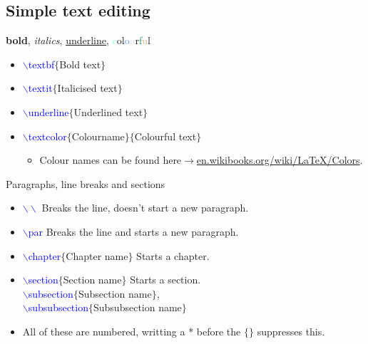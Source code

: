 \documentclass[usenames,dvipsnames,aspectratio=169]{beamer}
\newcommand{\aitem}{\item[$\cdot$]}
\begin{document}
\subsection{Simple text editing}
\begin{frame}[t]{\textbf{bold}, \textit{italics}, \underline{underline}, \textcolor{Aquamarine}{c}\textcolor{BrickRed}{o}\textcolor{CarnationPink}{l}\textcolor{CornflowerBlue}{o}\textcolor{Lavender}{u}\textcolor{Periwinkle}{r}\textcolor{SeaGreen}{f}\textcolor{Tan}{u}\textcolor{WildStrawberry}{l}}
\begin{itemize}
\item \textcolor{blue}{$\backslash$textbf}\textcolor{PineGreen}{$\{$Bold text$\}$}
\item \textcolor{blue}{$\backslash$textit}\textcolor{PineGreen}{$\{$Italicised text$\}$}
\item \textcolor{blue}{$\backslash$underline}\textcolor{PineGreen}{$\{$Underlined text$\}$}
\item \textcolor{blue}{$\backslash$textcolor}\textcolor{PineGreen}{$\{$Colourname$\}$}$\{$Colourful text$\}$
\begin{itemize}
\item Colour names can be found here$\rightarrow$\textcolor{blue}{\url{en.wikibooks.org/wiki/LaTeX/Colors}}.
\end{itemize}
\end{itemize}
\end{frame}


\begin{frame}[t]{Paragraphs, line breaks and sections}
\begin{itemize}
\aitem \textcolor{blue}{$\backslash\backslash$} Breaks the line, doesn't start a new paragraph.
\aitem \textcolor{blue}{$\backslash$par} Breaks the line and starts a new paragraph.
\aitem \textcolor{blue}{$\backslash$chapter}\textcolor{PineGreen}{$\{$Chapter name$\}$} Starts a chapter.
\aitem \textcolor{blue}{$\backslash$section}\textcolor{PineGreen}{$\{$Section name$\}$} Starts a section.\\ 
\textcolor{blue}{$\backslash$subsection}\textcolor{PineGreen}{$\{$Subsection name$\}$},\\ 
\textcolor{blue}{$\backslash$subsubsection}\textcolor{PineGreen}{$\{$Subsubsection name$\}$}
\aitem All of these are numbered, writting a * before the $\{\}$ suppresses this.
\end{itemize}
\end{frame}
\end{document}
